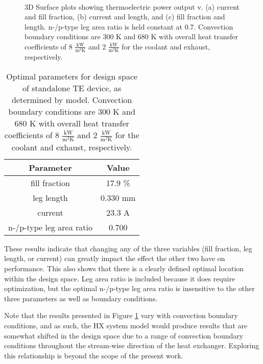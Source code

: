 \documentclass[preprint,authoryear,12pt]{elsarticle}
\begin{document}
\begin{figure}[H]
  \centering
   \\
  \caption{3D Surface plots showing thermoelectric power output v. (a)
    current and fill fraction, (b) current and length, and (c) fill
    fraction and length.  n-/p-type leg area ratio is held constant at
    0.7.  Convection boundary conditions are 300 K and 680 K with
    overall heat transfer coefficients of 8
    $\frac{\text{kW}}{\text{m}^2\text{K}}$ and 2
    $\frac{\text{kW}}{\text{m}^2\text{K}}$ for the coolant and
    exhaust, respectively.}  %
  \label{fig:te_design_space}
\end{figure}
\begin{table}[H]
  \centering
  \caption{Optimal parameters for design space of standalone TE
    device, as determined by model. Convection boundary conditions are
    300 K and 680 K with overall heat transfer coefficients of 8
    $\frac{\text{kW}}{\text{m}^2\text{K}}$ and 2
    $\frac{\text{kW}}{\text{m}^2\text{K}}$ for the coolant and
    exhaust, respectively.}
  \begin{tabular}[H]{cc}
    Parameter & Value \\
    \hline
    fill fraction & 17.9 \% \\
    leg length & 0.330 mm\\
    current & 23.3 A \\
    n-/p-type leg area ratio & 0.700 \\
  \end{tabular}
  \label{tab:te-design-space-opt}
\end{table}
These results indicate that changing any of the three variables (fill
fraction, leg length, or current) can greatly impact the effect the
other two have on performance.  This also shows that there is a
clearly defined optimal location within the design space.  Leg area
ratio is included because it does require optimization, but the
optimal n-/p-type leg area ratio is insensitive to the other three
parameters as well as boundary conditions.

Note that the results presented in Figure \ref{fig:te_design_space}
vary with convection boundary conditions, and as such, the HX system
model would produce results that are somewhat shifted in the design
space due to a range of convection boundary conditions throughout the
stream-wise direction of the heat exchanger.  Exploring this
relationship is beyond the scope of the present work.  
\end{document}

